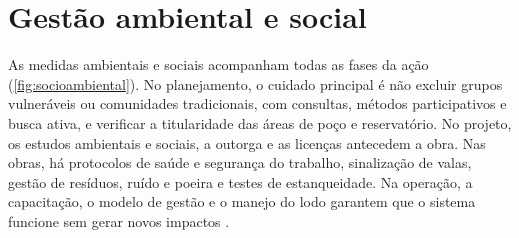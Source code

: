 \FloatBarrier
\section{Gestão ambiental e social}
\label{sec:salvaguardas}

As medidas ambientais e sociais acompanham todas as fases da ação
(\autoref{fig:socioambiental}). No planejamento, o cuidado principal é não
excluir grupos vulneráveis ou comunidades tradicionais, com consultas,
métodos participativos e busca ativa, e verificar a titularidade das áreas de
poço e reservatório. No projeto, os estudos ambientais e sociais, a outorga e
as licenças antecedem a obra. Nas obras, há protocolos de saúde e segurança do
trabalho, sinalização de valas, gestão de resíduos, ruído e poeira e testes de
estanqueidade. Na operação, a capacitação, o modelo de gestão e o manejo do
lodo garantem que o sistema funcione sem gerar novos impactos
\cite[Quadros 25 e 26]{mop2026}.

